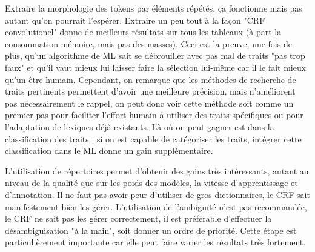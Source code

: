 \documentclass[PhD-Yoann-Dupont.tex]{subfiles}
\begin{document}
Extraire la morphologie des tokens par éléments répétés, ça fonctionne mais pas autant qu'on pourrait l'espérer. Extraire un peu tout à la façon "CRF convolutionel" donne de meilleurs résultats sur tous les tableaux (à part la consommation mémoire, mais pas des masses). Ceci est la preuve, une fois de plus, qu'un algorithme de ML sait se débrouiller avec pas mal de traits "pas trop faux" et qu'il vaut mieux lui laisser faire la sélection lui-même car il le fait mieux qu'un être humain. Cependant, on remarque que les méthodes de recherche de traits pertinents permettent d'avoir une meilleure précision, mais n'améliorent pas nécessairement le rappel, on peut donc voir cette méthode soit comme un premier pas pour faciliter l'effort humain à utiliser des traits spécifiques ou pour l'adaptation de lexiques déjà existants. Là où on peut gagner est dans la classification des traits : si on est capable de catégoriser les traits, intégrer cette classification dans le ML donne un gain supplémentaire.

L'utilisation de répertoires permet d'obtenir des gains très intéressants, autant au niveau de la qualité que sur les poids des modèles, la vitesse d'apprentissage et d'annotation. Il ne faut pas avoir peur d'utiliser de gros dictionnaires, le CRF sait manifestement bien les gérer. L'utilisation de l'ambiguïté n'est pas recommandée, le CRF ne sait pas les gérer correctement, il est préférable d'effectuer la désambiguisation "à la main", soit donner un ordre de priorité. Cette étape est particulièrement importante car elle peut faire varier les résultats très fortement.
\end{document}
